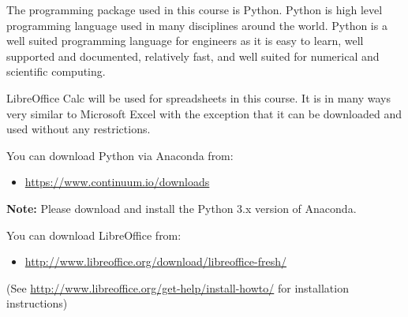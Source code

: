         The programming package used in this course is Python. Python is
        high level programming language used in many disciplines around the
        world. Python is a well suited programming language for engineers as
        it is easy to learn, well supported and documented, relatively fast,
        and well suited for numerical and scientific computing.

        LibreOffice Calc will be used for spreadsheets in this course. It is
        in many ways very similar to Microsoft Excel with the exception
        that it can be downloaded and used without any restrictions.

        \noindent
        You can download Python via Anaconda from:
        \begin{itemize}
            \item \url{https://www.continuum.io/downloads}
        \end{itemize}
        \textbf{Note:} Please download and install the Python 3.x version of
        Anaconda.

        \noindent
        You can download LibreOffice from:
        \begin{itemize}
            \item \url{http://www.libreoffice.org/download/libreoffice-fresh/}
        \end{itemize}
        (See \url{http://www.libreoffice.org/get-help/install-howto/}
        for installation instructions)
